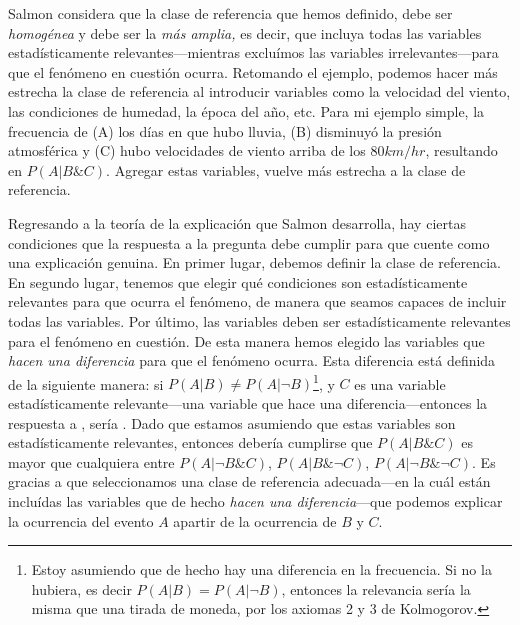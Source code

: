 Salmon considera que la clase de referencia que hemos definido, debe ser \emph{homogénea} y debe ser la \emph{más amplia,} es decir, que incluya todas las variables estadísticamente relevantes---mientras excluímos las variables irrelevantes---para que el fenómeno en cuestión ocurra. Retomando el ejemplo, podemos hacer más estrecha la clase de referencia al introducir variables como la velocidad del viento, las condiciones de humedad, la época del año, etc. Para mi ejemplo simple, la frecuencia de (A) los días en que hubo lluvia, (B) disminuyó la presión atmosférica y (C) hubo velocidades de viento arriba de los $ 80 km/hr $, resultando en $ P( A | B \& C ) $. Agregar estas variables, vuelve más estrecha a la clase de referencia.

Regresando a la teoría de la explicación que Salmon
desarrolla, hay ciertas condiciones que la respuesta a la pregunta  debe cumplir para que cuente como una explicación genuina. En primer lugar, debemos definir la clase de referencia. En segundo lugar, tenemos que elegir qué condiciones son estadísticamente relevantes para que ocurra el fenómeno, de manera que seamos capaces de incluir todas las variables. Por último, las variables deben ser estadísticamente relevantes para el fenómeno en cuestión. De esta manera hemos elegido las variables que \emph{hacen una diferencia} para que el fenómeno ocurra. Esta diferencia está definida de la siguiente manera: si $ P( A | B ) \neq P( A | \neg{ B } ) $\footnote{
	Estoy asumiendo que de hecho hay una diferencia en la frecuencia. Si no la hubiera, es decir $ P( A | B ) = P( A | \neg{ B } ) $, entonces la relevancia sería la misma que una tirada	de moneda, por los axiomas 2 y	3 de Kolmogorov.
},
y $C$ es una variable estadísticamente relevante---una variable que hace una diferencia---entonces la respuesta a , sería . Dado que estamos asumiendo que estas variables son estadísticamente relevantes, entonces debería cumplirse que $ P( A | B \& C )$ es mayor que cualquiera entre $ P( A | \neg{ B } \&	C ) $, $ P( A | B \& \neg{ C } ) $, $ P( A | \neg{ B } \& \neg{ C } ) $. Es gracias a que seleccionamos una clase de referencia adecuada---en la cuál están incluídas las variables que de hecho \emph{hacen una diferencia}---que podemos explicar la ocurrencia del evento $ A $ apartir de la ocurrencia de $ B $ y $ C $.

